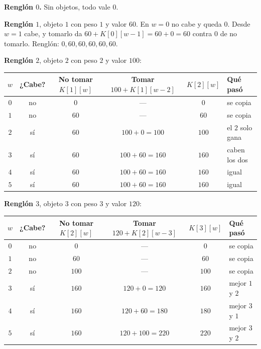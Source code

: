 \documentclass[11pt,letterpaper]{article}
\begin{document}
\textbf{Renglón $0$.} Sin objetos, todo vale $0$.

\textbf{Renglón $1$}, objeto $1$ con peso $1$ y valor $60$. En $w = 0$
no cabe y queda $0$. Desde $w = 1$ cabe, y tomarlo da
$60 + K[0][w-1] = 60 + 0 = 60$ contra $0$ de no tomarlo. Renglón:
$0, 60, 60, 60, 60, 60$.

\textbf{Renglón $2$}, objeto $2$ con peso $2$ y valor $100$:

\begin{center}
\small
\begin{tabular}{cccccl}
  \toprule
  $w$ & \textbf{¿Cabe?} & \textbf{No tomar} $K[1][w]$
      & \textbf{Tomar} $100 + K[1][w-2]$ & $K[2][w]$
      & \textbf{Qué pasó} \\
  \midrule
  $0$ & no & $0$  & ---               & $0$   & se copia \\
  $1$ & no & $60$ & ---               & $60$  & se copia \\
  $2$ & sí & $60$ & $100 + 0 = 100$   & $100$ & el $2$ solo gana \\
  $3$ & sí & $60$ & $100 + 60 = 160$  & $160$ & caben los dos \\
  $4$ & sí & $60$ & $100 + 60 = 160$  & $160$ & igual \\
  $5$ & sí & $60$ & $100 + 60 = 160$  & $160$ & igual \\
  \bottomrule
\end{tabular}
\end{center}

\textbf{Renglón $3$}, objeto $3$ con peso $3$ y valor $120$:

\begin{center}
\small
\begin{tabular}{cccccl}
  \toprule
  $w$ & \textbf{¿Cabe?} & \textbf{No tomar} $K[2][w]$
      & \textbf{Tomar} $120 + K[2][w-3]$ & $K[3][w]$
      & \textbf{Qué pasó} \\
  \midrule
  $0$ & no & $0$   & ---              & $0$   & se copia \\
  $1$ & no & $60$  & ---              & $60$  & se copia \\
  $2$ & no & $100$ & ---              & $100$ & se copia \\
  $3$ & sí & $160$ & $120 + 0 = 120$  & $160$ & mejor $1$ y $2$ \\
  $4$ & sí & $160$ & $120 + 60 = 180$ & $180$ & mejor $3$ y $1$ \\
  $5$ & sí & $160$ & $120 + 100 = 220$ & $220$ & mejor $3$ y $2$ \\
  \bottomrule
\end{tabular}
\end{center}
\end{document}
